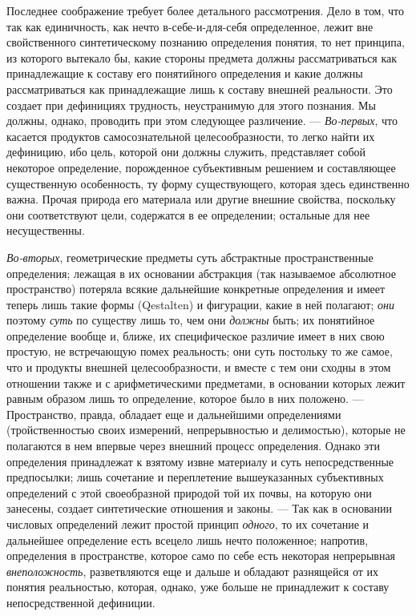 \documentclass[twoside]{article}
\begin{document}
Последнее соображение требует более детального рассмотрения.
Дело в том, что так как единичность, как нечто
в-себе-и-для-себя определенное, лежит вне свойственного
синтетическому познанию определения понятия, то нет принципа, из которого
вытекало бы, какие стороны предмета должны рассматриваться как
принадлежащие к составу его понятийного определения и какие должны
рассматриваться как принадлежащие лишь к составу внешней реальности. Это
создает при дефинициях трудность, неустранимую для этого познания. Мы
должны, однако, проводить при этом следующее различение. —
{\em Во-первых}, что
касается продуктов самосознательной целесообразности, то легко найти их
дефиницию, ибо цель, которой они должны служить, представляет собой
некоторое определение, порожденное субъективным решением и составляющее
существенную особенность, ту форму существующего, которая здесь единственно
важна. Прочая природа его материала или другие внешние свойства, поскольку
они соответствуют цели, содержатся в ее определении; остальные для нее
несущественны.

{\em Во-вторых},
геометрические предметы суть абстрактные пространственные
определения; лежащая в их основании абстракция (так называемое абсолютное
пространство) потеряла всякие дальнейшие конкретные определения и имеет
теперь лишь такие формы (Qestalten) и фигурации, какие в ней
полагают; {\em они}
поэтому {\em суть}
по существу лишь то, чем они
{\em должны} быть; их
понятийное определение вообще и, ближе, их специфическое
различие имеет в них свою простую, не встречающую помех реальность; они
суть постольку то же самое, что и продукты внешней целесообразности, и
вместе с тем они сходны в этом отношении также и с арифметическими
предметами, в основании которых лежит равным образом лишь то определение,
которое было в них положено. — Пространство, правда,
обладает еще и дальнейшими определениями (тройственностью своих измерений,
непрерывностью и делимостью), которые не полагаются в нем впервые через
внешний процесс определения. Однако эти определения принадлежат к взятому
извне материалу и суть непосредственные предпосылки; лишь сочетание и
переплетение вышеуказанных субъективных определений с этой своеобразной
природой той их почвы, на которую они занесены, создает синтетические
отношения и законы. — Так как в основании числовых
определений лежит простой принцип
{\em одного}, то их
сочетание и дальнейшее определение есть всецело лишь нечто положенное;
напротив, определения в пространстве, которое само по себе есть некоторая
непрерывная {\em внеположность},
разветвляются еще и дальше и обладают разнящейся от их
понятия реальностью, которая, однако, уже больше не принадлежит к составу
непосредственной дефиниции.
\end{document}
